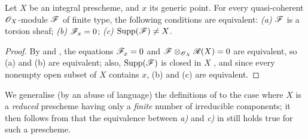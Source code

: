\begin{prop}[7.4.6]
\label{1.7.4.6}
Let $X$ be an integral prescheme, and $x$ its generic point.
For every quasi-coherent $\mathscr{O}_X$-module $\mathscr{F}$ of finite type, the following conditions are equivalent: \emph{(a)} $\mathscr{F}$ is a torsion sheaf; \emph{(b)} $\mathscr{F}_x=0$; \emph{(c)} ${\mathop{\mathrm{Supp}}\nolimits}(\mathscr{F})\neq X$.
\end{prop}

\begin{proof}
\label{proof-1.7.4.6}
By  and , the equations $\mathscr{F}_x=0$ and $\mathscr{F}\otimes_{\mathscr{O}_X}\mathscr{R}(X)=0$ are equivalent, so (a) and (b) are equivalent; also, ${\mathop{\mathrm{Supp}}\nolimits}(\mathscr{F})$ is closed in $X$ , and since every nonempty open subset of $X$ contains $x$, (b) and (c) are equivalent.
\end{proof}

\begin{env}[7.4.7]
\label{1.7.4.7}
We generalise (by an abuse of language) the definitions of  to the case where $X$ is a \emph{reduced} prescheme having only a \emph{finite} number of irreducible components; it then follows from  that the equivalence between \emph{a)} and \emph{c)} in  still holds true for such a prescheme.
\end{env}
